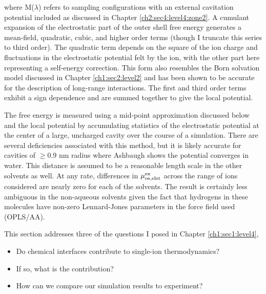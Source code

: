 \begin{tatb}
   \noindent where M($\lambda$) refers to sampling configurations with an external cavitation potential included as discussed in Chapter \ref{ch2:sec4:level4:zone2}.
   A cumulant expansion of the electrostatic part of the outer shell free energy generates a mean-field, quadratic, cubic, and higher order terms (though I truncate this 
   series to third order). The quadratic term depends on the square of the ion charge and fluctuations in the electrostatic potential felt by the ion, with the other part
   here representing a self-energy correction. This form also resembles the Born solvation model discussed in Chapter \ref{ch1:sec2:level2} and has been shown to be 
   accurate for the description of long-range interactions\cite{beck2011local,beck2011lmft,hummer1996,shi2013length}. The first and third order terms exhibit a sign
   dependence and are summed together to give the local potential. 
   
   The free energy is measured using a mid-point approximation discussed below and the local potential by accumulating statistics of the electrostatic potential at the 
   center of a large, uncharged cavity over the course of a simulation. There are several deficiencies associated with this method, but it is likely accurate for cavities 
   of $\ge$0.9 nm radius where Ashbaugh shows the potential converges in water\cite{ashbaugh2008lps}. This distance is assumed to be a reasonable length scale in the other
   solvents as well. At any rate, differences in $\mu^{\mathrm{ex}}_{\mathrm{os,elst}}$ across the range of ions considered are nearly zero for each of the solvents. The result is 
   certainly less ambiguous in the non-aqueous solvents given the fact that hydrogens in these molecules have non-zero Lennard-Jones parameters in the force field used 
   (OPLS/AA).

   This section addresses three of the questions I posed in Chapter \ref{ch1:sec1:level4},
   
   \begin{itemize}
       \item Do chemical interfaces contribute to single-ion thermodynamics? 
       \item If so, what is the contribution?
       \item How can we compare our simulation results to experiment?
   \end{itemize}


\end{tatb}
